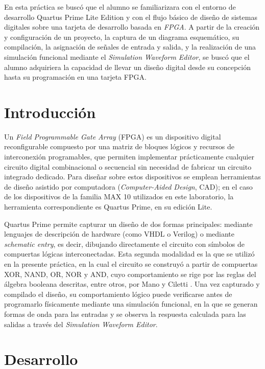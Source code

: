 En esta práctica se buscó que el alumno se familiarizara con el entorno de desarrollo
Quartus Prime Lite Edition y con el flujo básico de diseño de sistemas digitales sobre
una tarjeta de desarrollo basada en \textit{FPGA}. A partir de la creación y
configuración de un proyecto, la captura de un diagrama esquemático, su compilación, la
asignación de señales de entrada y salida, y la realización de una simulación funcional
mediante el \textit{Simulation Waveform Editor}, se buscó que el alumno adquiriera la
capacidad de llevar un diseño digital desde su concepción hasta su programación en una
tarjeta FPGA.

\section{Introducción}

Un \textit{Field Programmable Gate Array} (FPGA) es un dispositivo digital
reconfigurable compuesto por una matriz de bloques lógicos y recursos de interconexión
programables, que permiten implementar prácticamente cualquier circuito digital
combinacional o secuencial sin necesidad de fabricar un circuito integrado dedicado.
Para diseñar sobre estos dispositivos se emplean herramientas de diseño asistido por
computadora (\textit{Computer-Aided Design}, CAD); en el caso de los dispositivos de la
familia MAX 10 utilizados en este laboratorio, la herramienta correspondiente es Quartus
Prime, en su edición Lite.

Quartus Prime permite capturar un diseño de dos formas principales: mediante lenguajes
de descripción de hardware (como VHDL o Verilog) o mediante \textit{schematic entry},
es decir, dibujando directamente el circuito con símbolos de compuertas lógicas
interconectadas. Esta segunda modalidad es la que se utilizó en la presente práctica, en
la cual el circuito se construyó a partir de compuertas XOR, NAND, OR, NOR y AND, cuyo
comportamiento se rige por las reglas del álgebra booleana descritas, entre otros, por
Mano y Ciletti \cite{mano}. Una vez capturado y compilado el diseño, su comportamiento
lógico puede verificarse antes de programarlo físicamente mediante una simulación
funcional, en la que se generan formas de onda para las entradas y se observa la
respuesta calculada para las salidas a través del \textit{Simulation Waveform Editor}.

\section{Desarrollo}


